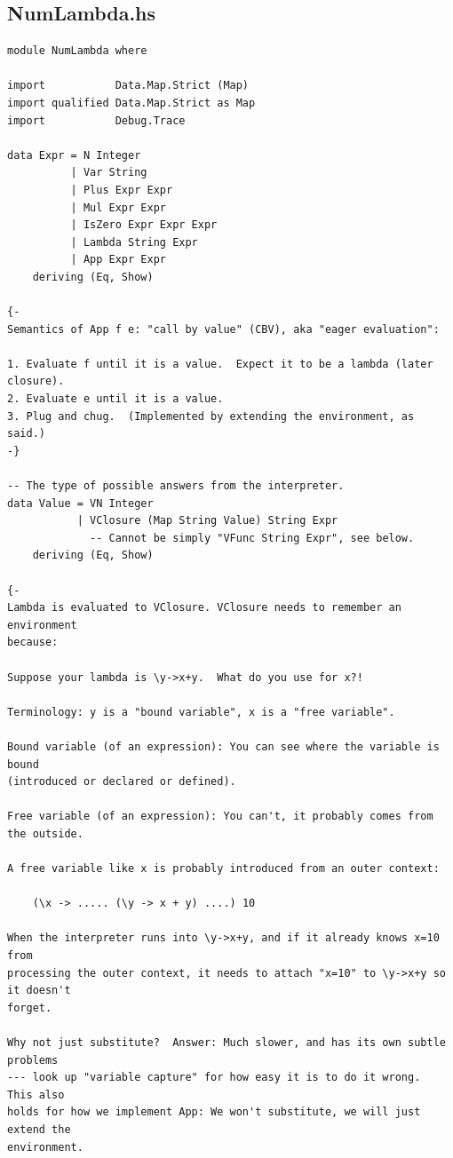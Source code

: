 \documentclass[12pt]{article}
\begin{document}
\newpage

\subsection{NumLambda.hs}

\begin{lstlisting}
module NumLambda where

import           Data.Map.Strict (Map)
import qualified Data.Map.Strict as Map
import           Debug.Trace

data Expr = N Integer
          | Var String
          | Plus Expr Expr
          | Mul Expr Expr
          | IsZero Expr Expr Expr
          | Lambda String Expr
          | App Expr Expr
    deriving (Eq, Show)

{-
Semantics of App f e: "call by value" (CBV), aka "eager evaluation":

1. Evaluate f until it is a value.  Expect it to be a lambda (later closure).
2. Evaluate e until it is a value.
3. Plug and chug.  (Implemented by extending the environment, as said.)
-}

-- The type of possible answers from the interpreter.
data Value = VN Integer
           | VClosure (Map String Value) String Expr
             -- Cannot be simply "VFunc String Expr", see below.
    deriving (Eq, Show)

{-
Lambda is evaluated to VClosure. VClosure needs to remember an environment
because:

Suppose your lambda is \y->x+y.  What do you use for x?!

Terminology: y is a "bound variable", x is a "free variable".

Bound variable (of an expression): You can see where the variable is bound
(introduced or declared or defined).

Free variable (of an expression): You can't, it probably comes from the outside.

A free variable like x is probably introduced from an outer context:

    (\x -> ..... (\y -> x + y) ....) 10

When the interpreter runs into \y->x+y, and if it already knows x=10 from
processing the outer context, it needs to attach "x=10" to \y->x+y so it doesn't
forget.

Why not just substitute?  Answer: Much slower, and has its own subtle problems
--- look up "variable capture" for how easy it is to do it wrong.  This also
holds for how we implement App: We won't substitute, we will just extend the
environment.


\end{lstlisting}
\end{document}
